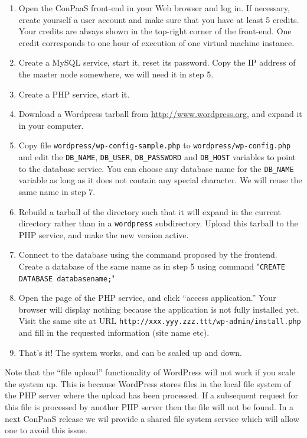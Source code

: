 \documentclass[10pt]{article}
\begin{document}
\begin{enumerate}
\item Open the ConPaaS front-end in your Web browser and log in. If
  necessary, create yourself a user account and make sure that you
  have at least 5 credits. Your credits are always shown in the
  top-right corner of the front-end. One credit corresponds to one
  hour of execution of one virtual machine instance.
\item Create a MySQL service, start it, reset its password. Copy the
  IP address of the master node somewhere, we will need it in step 5.
\item Create a PHP service, start it.
\item Download a Wordpress tarball from \url{http://www.wordpress.org}, and
  expand it in your computer.
\item Copy file \texttt{wordpress/wp-config-sample.php} to
  \texttt{wordpress/wp-config.php} and edit the \texttt{DB\_NAME},
  \texttt{DB\_USER}, \texttt{DB\_PASSWORD} and \texttt{DB\_HOST}
  variables to point to the database service. You can choose any
  database name for the \texttt{DB\_NAME} variable as long as it does
  not contain any special character. We will reuse the same name in
  step 7.
\item Rebuild a tarball of the directory such that it will expand in
  the current directory rather than in a \texttt{wordpress}
  subdirectory. Upload this tarball to the PHP service, and make the
  new version active. 
\item Connect to the database using the command proposed by the
  frontend. Create a database of the same name as in step 5 using
  command "\texttt{CREATE DATABASE databasename;}"
\item Open the page of the PHP service, and click ``access
  application.'' Your browser will display nothing because the
  application is not fully installed yet. Visit the same site at URL
  \texttt{http://xxx.yyy.zzz.ttt/wp-admin/install.php} and fill in the
  requested information (site name etc).
\item That's it! The system works, and can be scaled up and down. 
\end{enumerate}

Note that the ``file upload'' functionality of WordPress will not work
if you scale the system up. This is because WordPress stores files in
the local file system of the PHP server where the upload has been
processed. If a subsequent request for this file is processed by
another PHP server then the file will not be found. In a next ConPaaS
release we wil provide a shared file system service which will allow
one to avoid this issue.
\end{document}

